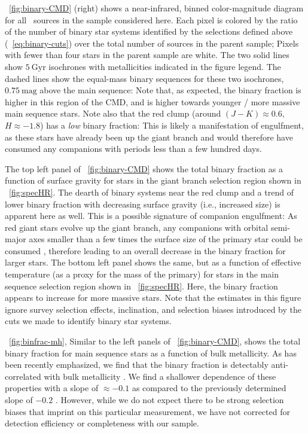 \documentclass[modern]{aastex63}
\begin{document}
\figurename~\ref{fig:binary-CMD} (right) shows a near-infrared, binned
color-magnitude diagram for all \apogee\ sources in the sample considered here.
Each pixel is colored by the ratio of the number of binary star systems
identified by the selections defined above (\equationname~\ref{eq:binary-cuts})
over the total number of sources in the parent sample; Pixels with fewer than
four stars in the parent sample are white.
The two solid lines show $5~\mathrm{Gyr}$  isochrones
\cite{Dotter:2016, Choi:2016, Paxton:2011, Paxton:2013, Paxton:2015} with
metallicities indicated in the figure legend.
The dashed lines show the equal-mass binary sequences for these two isochrones,
$0.75~\mathrm{mag}$ above the main sequence: Note that, as expected, the binary
fraction is higher in this region of the CMD, and is higher towards younger /
more massive main sequence stars.
Note also that the red clump (around $(J-K) \approx 0.6$, $H \approx -1.8$) has
a \emph{low} binary fraction: This is likely a manifestation of engulfment, as
these stars have already been up the giant branch and would therefore have
consumed any companions with periods less than a few hundred days.

The top left panel of \figurename~\ref{fig:binary-CMD} shows the total binary
fraction as a function of surface gravity for stars in the giant branch
selection region shown in \figurename~\ref{fig:specHR}.
The dearth of binary systems near the red clump and a trend of lower binary
fraction with decreasing surface gravity (i.e., increased size) is apparent here
as well.
This is a possible signature of companion engulfment: As red giant stars evolve
up the giant branch, any companions with orbital semi-major axes smaller than a
few times the surface size of the primary star could be consumed \citep{TODO},
therefore leading to an overall decrease in the binary fraction for larger
stars.
The bottom left panel shows the same, but as a function of effective temperature
(as a proxy for the mass of the primary) for stars in the main sequence
selection region shown in \figurename~\ref{fig:specHR}.
Here, the binary fraction appears to increase for more massive stars.
Note that the estimates in this figure ignore survey selection effects,
inclination, and selection biases introduced by the cuts we made to identify
binary star systems.

\figurename~\ref{fig:binfrac-mh}, Similar to the left panels of
\figurename~\ref{fig:binary-CMD}, shows the total binary fraction for main
sequence stars as a function of bulk metallicity.
As has been recently emphasized, we find that the binary fraction is detectably
anti-correlated with bulk metallicity \citep[e.g.,][]{Moe:2019}.
We find a shallower dependence of these properties with a slope of $\approx
-0.1$ as compared to the previously determined slope of $-0.2$ \citep{Moe:2019}.
However, while we do not expect there to be strong selection biases that imprint
on this particular measurement, we have not corrected for detection efficiency
or completeness with our sample.
\end{document}
